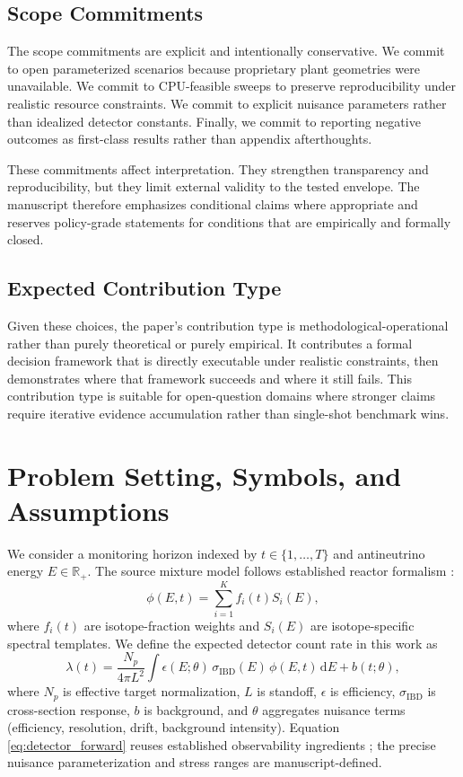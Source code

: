 \documentclass{article} %
\begin{document}
\subsection{Scope Commitments}
The scope commitments are explicit and intentionally conservative. We commit to open parameterized scenarios because proprietary plant geometries were unavailable. We commit to CPU-feasible sweeps to preserve reproducibility under realistic resource constraints. We commit to explicit nuisance parameters rather than idealized detector constants. Finally, we commit to reporting negative outcomes as first-class results rather than appendix afterthoughts.

These commitments affect interpretation. They strengthen transparency and reproducibility, but they limit external validity to the tested envelope. The manuscript therefore emphasizes conditional claims where appropriate and reserves policy-grade statements for conditions that are empirically and formally closed.

\subsection{Expected Contribution Type}
Given these choices, the paper's contribution type is methodological-operational rather than purely theoretical or purely empirical. It contributes a formal decision framework that is directly executable under realistic constraints, then demonstrates where that framework succeeds and where it still fails. This contribution type is suitable for open-question domains where stronger claims require iterative evidence accumulation rather than single-shot benchmark wins.

\section{Problem Setting, Symbols, and Assumptions}\label{sec:problem_setting}
We consider a monitoring horizon indexed by $t\in\{1,\dots,T\}$ and antineutrino energy $E\in\mathbb{R}_+$. The source mixture model follows established reactor formalism \citep{SRC014,SRC030}:
\begin{equation}
\phi(E,t)=\sum_{i=1}^{K} f_i(t) S_i(E),
\label{eq:source_mixture}
\end{equation}
where $f_i(t)$ are isotope-fraction weights and $S_i(E)$ are isotope-specific spectral templates. We define the expected detector count rate in this work as
\begin{equation}
\lambda(t)=\frac{N_p}{4\pi L^2}\int \epsilon(E;\theta)\,\sigma_{\mathrm{IBD}}(E)\,\phi(E,t)\,\mathrm{d}E + b(t;\theta),
\label{eq:detector_forward}
\end{equation}
where $N_p$ is effective target normalization, $L$ is standoff, $\epsilon$ is efficiency, $\sigma_{\mathrm{IBD}}$ is cross-section response, $b$ is background, and $\theta$ aggregates nuisance terms (efficiency, resolution, drift, background intensity). Equation \eqref{eq:detector_forward} reuses established observability ingredients \citep{SRC023,SRC009,SRC001}; the precise nuisance parameterization and stress ranges are manuscript-defined.
\end{document}
